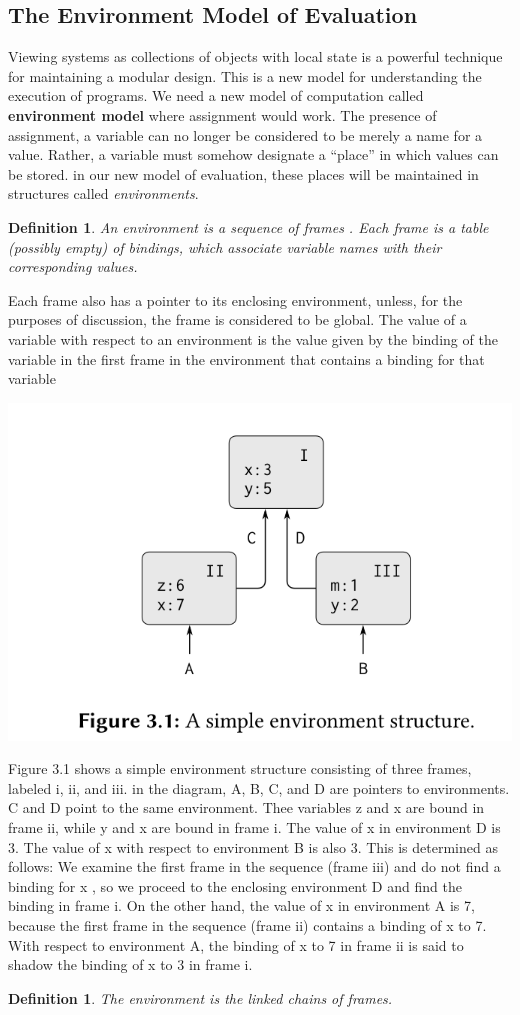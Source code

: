 \documentclass[a4paper,twoside]{article}
\newtheorem{definition}[theorem]{Definition}
\numberwithin{equation}{section}
\begin{document}
\subsection{The Environment Model of Evaluation}
Viewing systems as collections of objects with local state is a powerful technique for maintaining
a modular design. This is a new model for understanding the execution of programs.
We need a new model of computation called \textbf{environment model} where assignment would work.
The presence of assignment, a variable can no longer be considered to be
merely a name for a value. Rather, a variable must somehow designate
a “place” in which values can be stored. in our new model of evaluation,
these places will be maintained in structures called \textit{environments}.
\begin{definition}
    An environment is a sequence of frames . Each frame is a table (possibly empty) of bindings,
    which associate variable names with their corresponding values.
\end{definition}
Each frame also has a pointer to its enclosing environment, unless,
for the purposes of discussion, the frame is considered to
be global. The value of a variable with respect to an environment is the
value given by the binding of the variable in the first frame in
the environment that contains a binding for that variable
\begin{center}
    \includegraphics[scale = 0.4]{assets/environment_structure.png}
\end{center}
Figure 3.1 shows a simple environment structure consisting of three
frames, labeled i, ii, and iii. in the diagram, A, B, C, and D are pointers to
environments. C and D point to the same environment. Thee variables z
and x are bound in frame ii, while y and x are bound in frame i. The value
of x in environment D is 3. The value of x with respect to environment
B is also 3. This is determined as follows: We examine the first frame in
the sequence (frame iii) and do not find a binding for x , so we proceed
to the enclosing environment D and find the binding in frame i. On the
other hand, the value of x in environment A is 7, because the first frame
in the sequence (frame ii) contains a binding of x to 7. With respect to
environment A, the binding of x to 7 in frame ii is said to shadow the
binding of x to 3 in frame i.
\begin{definition}
    The environment is the linked chains of frames.
\end{definition}
\end{document}
